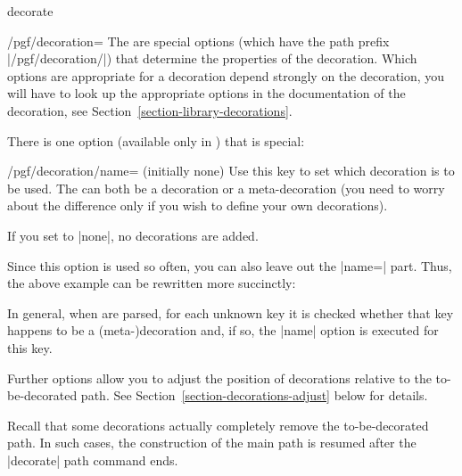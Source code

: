 \begin{pathoperation}{decorate}{}
\begin{key}{/pgf/decoration=}
    The  are special options
    (which have the path prefix |/pgf/decoration/|) that determine the
    properties of the decoration. Which options are appropriate for a
    decoration depend strongly on the decoration, you will have to look
    up the appropriate options in the documentation of the decoration,
    see Section~\ref{section-library-decorations}.
    
    There is one option (available only in \tikzname) that is special:
    \begin{key}{/pgf/decoration/name= (initially none)}
      Use this key to set which decoration is to be used. The
       can both be a decoration or a meta-decoration (you
      need to worry about the difference only if you wish to define
      your own decorations).
      
      If you set  to |none|, no decorations are added.
\begin{codeexample}[]
\end{codeexample}
      Since this option is used so often, you can also leave out the
      |name=| part. Thus, the above example can be rewritten more
      succinctly: 
\begin{codeexample}[]
\end{codeexample}
      In general, when  are parsed, for each
      unknown key it is checked whether that key happens to be a
      (meta-)decoration and, if so, the |name| option is executed for
      this key.
    \end{key}

    Further options allow you to adjust the position of decorations
    relative to the to-be-decorated path. See
    Section~\ref{section-decorations-adjust} below for details.
  \end{key}

  Recall that some decorations actually completely remove the
  to-be-decorated path. In such cases, the construction of the main
  path is resumed after the |decorate| path command ends.
  

\end{pathoperation}
